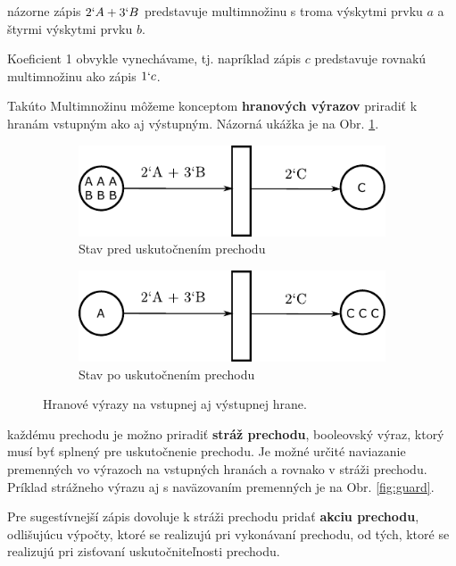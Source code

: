 \begin{exmpl}
	názorne zápis $2`A + 3`B$ predstavuje multimnožinu s troma výskytmi prvku $a$ a štyrmi výskytmi prvku $b$.
\end{exmpl}

\begin{note}
	Koeficient 1 obvykle vynechávame, tj. napríklad zápis $c$ predstavuje rovnakú multimnožinu ako zápis $1`c$.
\end{note}

Takúto Multimnožinu môžeme konceptom \textbf{hranových výrazov} priradiť k hranám vstupným ako aj výstupným. Názorná ukážka je na Obr. \ref{fig:edge-expr}.

\begin{figure}[H]
	\centering
	\begin{subfigure}[t]{0.4\textwidth}
		\centering
		\includegraphics[scale=0.75]{obrazky-figures/PN-edge-expr}
		\caption{Stav pred uskutočnením prechodu}
	\end{subfigure}
	\begin{subfigure}[t]{0.4\textwidth}
		\centering
		\includegraphics[scale=0.75]{obrazky-figures/PN-edge-exprR}
		\caption{Stav po uskutočnením prechodu}
	\end{subfigure}
	\caption{Hranové výrazy na vstupnej aj výstupnej hrane.}
	\label{fig:edge-expr}
\end{figure}
každému prechodu je možno priradiť \textbf{stráž prechodu}, booleovský výraz, ktorý musí byť splnený pre uskutočnenie prechodu. Je možné určité naviazanie
premenných vo výrazoch na vstupných hranách a rovnako v stráži prechodu. Príklad strážneho výrazu  aj s naväzovaním premenných je na Obr. \ref{fig:guard}.

Pre sugestívnejší zápis dovoluje k stráži prechodu pridať \textbf{akciu prechodu}, odlišujúcu výpočty, ktoré se realizujú pri vykonávaní prechodu, od tých, ktoré se realizujú pri zisťovaní uskutočniteľnosti prechodu.

